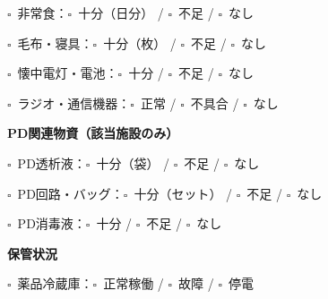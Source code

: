 \documentclass[a4paper,12pt]{jarticle}
\newcommand{\checkbox}{$\square$\ }
\newcommand{\underlinespace}[1]{\underline{\hspace{#1}}}
\begin{document}
\noindent
\checkbox 非常食：\quad \checkbox 十分（\underlinespace{2cm}日分） \quad / \quad \checkbox 不足 \quad / \quad \checkbox なし

\vspace{2mm}

\noindent
\checkbox 毛布・寝具：\quad \checkbox 十分（\underlinespace{2cm}枚） \quad / \quad \checkbox 不足 \quad / \quad \checkbox なし

\vspace{2mm}

\noindent
\checkbox 懐中電灯・電池：\quad \checkbox 十分 \quad / \quad \checkbox 不足 \quad / \quad \checkbox なし

\vspace{2mm}

\noindent
\checkbox ラジオ・通信機器：\quad \checkbox 正常 \quad / \quad \checkbox 不具合 \quad / \quad \checkbox なし

\vspace{8mm}

\begin{center}
\textbf{\large PD関連物資（該当施設のみ）}
\end{center}

\vspace{3mm}

\noindent
\checkbox PD透析液：\quad \checkbox 十分（\underlinespace{2cm}袋） \quad / \quad \checkbox 不足 \quad / \quad \checkbox なし

\vspace{2mm}

\noindent
\checkbox PD回路・バッグ：\quad \checkbox 十分（\underlinespace{2cm}セット） \quad / \quad \checkbox 不足 \quad / \quad \checkbox なし

\vspace{2mm}

\noindent
\checkbox PD消毒液：\quad \checkbox 十分 \quad / \quad \checkbox 不足 \quad / \quad \checkbox なし

\vspace{8mm}

\begin{center}
\textbf{\large 保管状況}
\end{center}

\vspace{3mm}

\noindent
\checkbox 薬品冷蔵庫：\quad \checkbox 正常稼働 \quad / \quad \checkbox 故障 \quad / \quad \checkbox 停電

\vspace{2mm}
\end{document}
